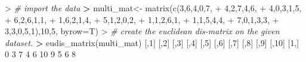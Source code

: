 \documentclass[
]{article}
\newenvironment{Shaded}{\begin{snugshade}}{\end{snugshade}}
\newcommand{\AttributeTok}[1]{\textcolor[rgb]{0.77,0.63,0.00}{#1}}
\newcommand{\CommentTok}[1]{\textcolor[rgb]{0.56,0.35,0.01}{\textit{#1}}}
\newcommand{\DecValTok}[1]{\textcolor[rgb]{0.00,0.00,0.81}{#1}}
\newcommand{\ErrorTok}[1]{\textcolor[rgb]{0.64,0.00,0.00}{\textbf{#1}}}
\newcommand{\FunctionTok}[1]{\textcolor[rgb]{0.00,0.00,0.00}{#1}}
\newcommand{\NormalTok}[1]{#1}
\newcommand{\OtherTok}[1]{\textcolor[rgb]{0.56,0.35,0.01}{#1}}
\newcommand{\SpecialCharTok}[1]{\textcolor[rgb]{0.00,0.00,0.00}{#1}}
\begin{document}
\begin{Shaded}
\begin{Highlighting}[]
\SpecialCharTok{\textgreater{}} \CommentTok{\# import the data}
\ErrorTok{\textgreater{}}\NormalTok{ multi\_mat}\OtherTok{\textless{}{-}} \FunctionTok{matrix}\NormalTok{(}\FunctionTok{c}\NormalTok{(}\DecValTok{3}\NormalTok{,}\DecValTok{6}\NormalTok{,}\DecValTok{4}\NormalTok{,}\DecValTok{0}\NormalTok{,}\DecValTok{7}\NormalTok{,}
\SpecialCharTok{+}                     \DecValTok{4}\NormalTok{,}\DecValTok{2}\NormalTok{,}\DecValTok{7}\NormalTok{,}\DecValTok{4}\NormalTok{,}\DecValTok{6}\NormalTok{,}
\SpecialCharTok{+}                     \DecValTok{4}\NormalTok{,}\DecValTok{0}\NormalTok{,}\DecValTok{3}\NormalTok{,}\DecValTok{1}\NormalTok{,}\DecValTok{5}\NormalTok{,}
\SpecialCharTok{+}                     \DecValTok{6}\NormalTok{,}\DecValTok{2}\NormalTok{,}\DecValTok{6}\NormalTok{,}\DecValTok{1}\NormalTok{,}\DecValTok{1}\NormalTok{,}
\SpecialCharTok{+}                     \DecValTok{1}\NormalTok{,}\DecValTok{6}\NormalTok{,}\DecValTok{2}\NormalTok{,}\DecValTok{1}\NormalTok{,}\DecValTok{4}\NormalTok{, }
\SpecialCharTok{+}                     \DecValTok{5}\NormalTok{,}\DecValTok{1}\NormalTok{,}\DecValTok{2}\NormalTok{,}\DecValTok{0}\NormalTok{,}\DecValTok{2}\NormalTok{,}
\SpecialCharTok{+}                     \DecValTok{1}\NormalTok{,}\DecValTok{1}\NormalTok{,}\DecValTok{2}\NormalTok{,}\DecValTok{6}\NormalTok{,}\DecValTok{1}\NormalTok{,}
\SpecialCharTok{+}                     \DecValTok{1}\NormalTok{,}\DecValTok{1}\NormalTok{,}\DecValTok{5}\NormalTok{,}\DecValTok{4}\NormalTok{,}\DecValTok{4}\NormalTok{,}
\SpecialCharTok{+}                     \DecValTok{7}\NormalTok{,}\DecValTok{0}\NormalTok{,}\DecValTok{1}\NormalTok{,}\DecValTok{3}\NormalTok{,}\DecValTok{3}\NormalTok{,}
\SpecialCharTok{+}                     \DecValTok{3}\NormalTok{,}\DecValTok{3}\NormalTok{,}\DecValTok{0}\NormalTok{,}\DecValTok{5}\NormalTok{,}\DecValTok{1}\NormalTok{),}\DecValTok{10}\NormalTok{,}\DecValTok{5}\NormalTok{, }\AttributeTok{byrow=}\NormalTok{T)}
\SpecialCharTok{\textgreater{}} \CommentTok{\# create the euclidean dis{-}matrix on the given dataset.}
\ErrorTok{\textgreater{}} \FunctionTok{eudis\_matrix}\NormalTok{(multi\_mat)}
\NormalTok{      [,}\DecValTok{1}\NormalTok{] [,}\DecValTok{2}\NormalTok{] [,}\DecValTok{3}\NormalTok{] [,}\DecValTok{4}\NormalTok{] [,}\DecValTok{5}\NormalTok{] [,}\DecValTok{6}\NormalTok{] [,}\DecValTok{7}\NormalTok{] [,}\DecValTok{8}\NormalTok{] [,}\DecValTok{9}\NormalTok{] [,}\DecValTok{10}\NormalTok{]}
\NormalTok{ [}\DecValTok{1}\NormalTok{,]    }\DecValTok{0}    \DecValTok{3}    \DecValTok{7}    \DecValTok{4}    \DecValTok{6}   \DecValTok{10}    \DecValTok{9}    \DecValTok{5}    \DecValTok{6}     \DecValTok{8}

\end{Highlighting}
\end{Shaded}
\end{document}
